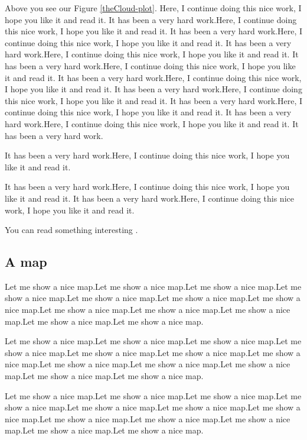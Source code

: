 \documentclass[11pt]{article}
\begin{document}
Above you see our Figure \ref{theCloud-plot}. Here, I continue doing this nice work, I hope you like it and read it. It has been a very hard work.Here, I continue doing this nice work, I hope you like it and read it. It has been a very hard work.Here, I continue doing this nice work, I hope you like it and read it. It has been a very hard work.Here, I continue doing this nice work, I hope you like it and read it. It has been a very hard work.Here, I continue doing this nice work, I hope you like it and read it. It has been a very hard work.Here, I continue doing this nice work, I hope you like it and read it. It has been a very hard work.Here, I continue doing this nice work, I hope you like it and read it. It has been a very hard work.Here, I continue doing this nice work, I hope you like it and read it. It has been a very hard work.Here, I continue doing this nice work, I hope you like it and read it. It has been a very hard work.

It has been a very hard work.Here, I continue doing this nice work, I hope you like it and read it.

It has been a very hard work.Here, I continue doing this nice work, I hope you like it and read it. It has been a very hard work.Here, I continue doing this nice work, I hope you like it and read it. 

You can read something interesting \citep{lipman_art_2022}.

\subsection{A map}\label{mapPlot}

Let me show a nice map.Let me show a nice map.Let me show a nice map.Let me show a nice map.Let me show a nice map.Let me show a nice map.Let me show a nice map.Let me show a nice map.Let me show a nice map.Let me show a nice map.Let me show a nice map.Let me show a nice map.

Let me show a nice map.Let me show a nice map.Let me show a nice map.Let me show a nice map.Let me show a nice map.Let me show a nice map.Let me show a nice map.Let me show a nice map.Let me show a nice map.Let me show a nice map.Let me show a nice map.Let me show a nice map.

Let me show a nice map.Let me show a nice map.Let me show a nice map.Let me show a nice map.Let me show a nice map.Let me show a nice map.Let me show a nice map.Let me show a nice map.Let me show a nice map.Let me show a nice map.Let me show a nice map.Let me show a nice map.
\end{document}
